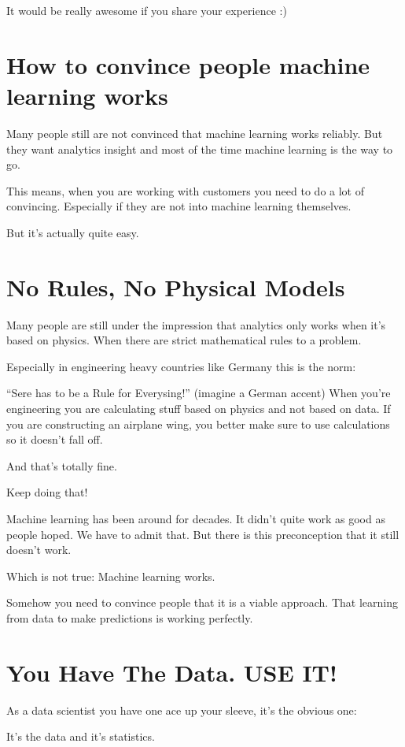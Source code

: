\documentclass[12pt, numbers=noenddot]{scrreprt} %
\begin{document}
It would be really awesome if you share your experience :)

\section{How to convince people machine learning works}
Many people still are not convinced that machine learning works reliably. But they want analytics insight and most of the time machine learning is the way to go.

This means, when you are working with customers you need to do a lot of convincing. Especially if they are not into machine learning themselves.

But it's actually quite easy.

\section{No Rules, No Physical Models}

Many people are still under the impression that analytics only works when it’s based on physics. When there are strict mathematical rules to a problem.

Especially in engineering heavy countries like Germany this is the norm:

“Sere has to be a Rule for Everysing!” (imagine a German accent)
When you’re engineering you are calculating stuff based on physics and not based on data. If you are constructing an airplane wing, you better make sure to use calculations so it doesn’t fall off.

And that’s totally fine.

Keep doing that!

Machine learning has been around for decades. It didn’t quite work as good as people hoped. We have to admit that. But there is this preconception that it still doesn’t work.

Which is not true: Machine learning works.

Somehow you need to convince people that it is a viable approach. That learning from data to make predictions is working perfectly.

\section{You Have The Data. USE IT!}

As a data scientist you have one ace up your sleeve, it’s the obvious one:

It’s the data and it’s statistics.
\end{document}
